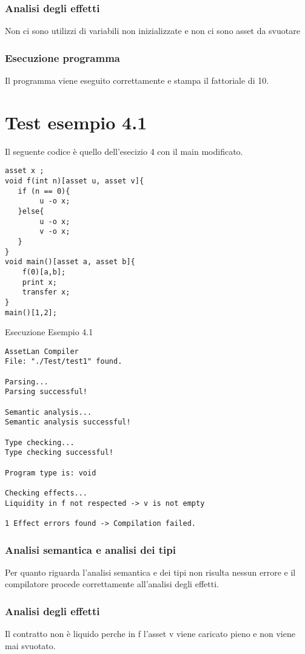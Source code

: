 \documentclass[12pt,twoside,openright,a4paper]{report}
\begin{document}
\subsubsection{Analisi degli effetti}
Non ci sono utilizzi di variabili non inizializzate e non ci sono asset da svuotare

\subsubsection{Esecuzione programma}
Il programma viene eseguito correttamente e stampa il fattoriale di 10.

\section{Test esempio 4.1}
Il seguente codice è quello dell'esecizio 4 con il main modificato.
\begin{lstlisting}
asset x ;
void f(int n)[asset u, asset v]{
   if (n == 0){
        u -o x;
   }else{
        u -o x;
        v -o x;
   }
}
void main()[asset a, asset b]{
	f(0)[a,b];
	print x;
	transfer x;
}
main()[1,2];
\end{lstlisting}

Esecuzione Esempio 4.1
\begin{lstlisting}
AssetLan Compiler
File: "./Test/test1" found.

Parsing...
Parsing successful!

Semantic analysis...
Semantic analysis successful!

Type checking...
Type checking successful!

Program type is: void

Checking effects...
Liquidity in f not respected -> v is not empty 

1 Effect errors found -> Compilation failed.
\end{lstlisting}

\subsubsection{Analisi semantica e analisi dei tipi}
Per quanto riguarda l'analisi semantica e dei tipi non risulta nessun errore e il compilatore procede correttamente all'analisi degli effetti.

\subsubsection{Analisi degli effetti}
Il contratto non è liquido perche in f l'asset v viene caricato pieno e non viene mai svuotato.
\end{document}
